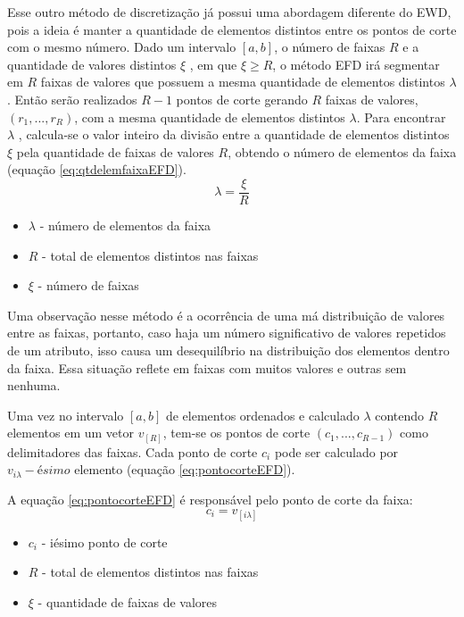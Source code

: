 Esse outro método de discretização já possui uma abordagem diferente do EWD, pois a ideia é manter a quantidade de elementos distintos entre os pontos de corte com o mesmo número. Dado um intervalo ${[a,b]}$, o número de faixas ${R}$ e a quantidade de valores distintos ${\xi}$ , em que ${\xi \geqslant R}$, o método EFD irá segmentar em ${R}$ faixas de valores que possuem a mesma quantidade de elementos distintos ${\lambda}$. Então serão realizados ${R-1}$ pontos de corte gerando ${R}$ faixas de valores, ${(r_1,...,r_R)}$, com a mesma quantidade de elementos distintos ${\lambda}$. Para encontrar ${\lambda}$ , calcula-se o valor inteiro da divisão entre a quantidade de elementos distintos ${\xi}$ pela quantidade de faixas de valores ${R}$, obtendo o número de elementos da faixa (equação \ref{eq:qtdelemfaixaEFD}). 
\begin{equation}
\lambda = \frac{\xi}{R}
 \label{eq:qtdelemfaixaEFD}
\end{equation}
\begin{itemize}[noitemsep]
 \item ${\lambda}$ - número de elementos da faixa
 \item ${R}$ - total de elementos distintos nas faixas
 \item ${\xi}$ - número de faixas
\end{itemize}


Uma observação nesse método é a ocorrência de uma má distribuição de valores entre as faixas, portanto, caso haja um número significativo de valores repetidos de um atributo, isso causa um desequilíbrio na distribuição dos elementos dentro da faixa. Essa situação reflete em faixas com muitos valores e outras sem nenhuma. 

Uma vez no intervalo ${[a,b]}$ de elementos ordenados e calculado ${\lambda}$ contendo ${R}$ elementos em um vetor ${v_{[R]}}$, tem-se os pontos de corte ${(c_1,...,c_{R-1})}$ como  delimitadores das faixas. Cada ponto de corte ${c_i}$ pode ser calculado por ${v_{i\lambda}-ésimo}$ elemento (equação \ref{eq:pontocorteEFD}).

A equação \ref{eq:pontocorteEFD} é responsável pelo ponto de corte da faixa:
\begin{equation}
c_i = v_{[i\lambda]}
 \label{eq:pontocorteEFD}
\end{equation}
\begin{itemize}[noitemsep]
 \item ${c_i}$ - iésimo ponto de corte
 \item ${R}$ - total de elementos distintos nas faixas
 \item ${\xi}$ - quantidade de faixas de valores
\end{itemize}

